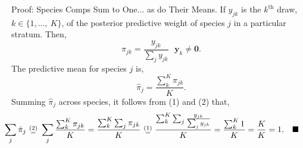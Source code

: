 \documentclass[ xcolor = pdftex, dvipsnames, table ]{beamer}
\begin{document}
%
%

%
\begin{frame}{Proof: Species Comps Sum to One... as do Their Means.}
%
If $y_{jk}$ is the $k^{\text{th}}$ draw, $k\in\{1,...,~K\}$, of the posterior predictive weight of species $j$ in a particular stratum. Then,
%
\begin{equation}
\pi_{jk} = \frac{y_{jk}}{\sum_j y_{jk}} ~~~ \bm{y}_{k}\neq \bm{0}.
\end{equation}
The predictive mean for species $j$ is,
\begin{equation}
        \hat\pi_{j} = \frac{\sum_k^K \pi_{jk}}{K}. 
\end{equation}
Summing $\hat\pi_{j}$ across species, it follows from (1) and (2) that,
\begin{equation*}
        \hspace*{-0.8cm}
        \sum_j \hat\pi_{j} ~\substack{(2)\\=}~ \sum_j\frac{\sum_k^K \pi_{jk}}{K} = \frac{\sum_k^K \sum_j \pi_{jk}}{K}~\substack{(1)\\=}~\frac{\sum_k^K \sum_j \frac{y_{jk}}{\sum_j y_{jk}}}{K} = \frac{\sum_k^K 1}{K} = \frac{K}{K}=1. ~~~\blacksquare
\end{equation*}
%
\end{frame}
\end{document}
